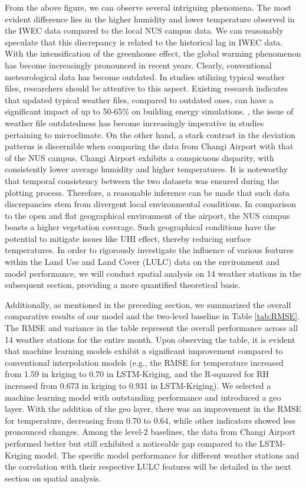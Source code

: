 \documentclass[a4paper,fleqn]{cas-sc}
\begin{document}
From the above figure, we can observe several intriguing phenomena. The most evident difference lies in the higher humidity and lower temperature observed in the IWEC data compared to the local NUS campus data. We can reasonably speculate that this discrepancy is related to the historical lag in IWEC data. With the intensification of the greenhouse effect, the global warming phenomenon has become increasingly pronounced in recent years. Clearly, conventional meteorological data has become outdated. In studies utilizing typical weather files, researchers should be attentive to this aspect. Existing research indicates that updated typical weather files, compared to outdated ones, can have a significant impact of up to 50-65\% on building energy simulations. \citep{costanzo2020updated}, the issue of weather file outdatedness has become increasingly imperative in studies pertaining to microclimate. On the other hand, a stark contrast in the deviation patterns is discernible when comparing the data from Changi Airport with that of the NUS campus. Changi Airport exhibits a conspicuous disparity, with consistently lower average humidity and higher temperatures. It is noteworthy that temporal consistency between the two datasets was ensured during the plotting process. Therefore, a reasonable inference can be made that such data discrepancies stem from divergent local environmental conditions. In comparison to the open and flat geographical environment of the airport, the NUS campus boasts a higher vegetation coverage. Such geographical conditions have the potential to mitigate issues like UHI effect, thereby reducing surface temperatures. In order to rigorously investigate the influence of various features within the Land Use and Land Cover (LULC) data on the environment and model performance, we will conduct spatial analysis on 14 weather stations in the subsequent section, providing a more quantified theoretical basis.

Additionally, as mentioned in the preceding section, we summarized the overall comparative results of our model and the two-level baseline in Table \ref{tab:RMSE}. The RMSE and variance in the table represent the overall performance across all 14 weather stations for the entire month. Upon observing the table, it is evident that machine learning models exhibit a significant improvement compared to conventional interpolation models (e.g., the RMSE for temperature increased from 1.59 in kriging to 0.70 in LSTM-Kriging, and the R-squared for RH increased from 0.673 in kriging to 0.931 in LSTM-Kriging). We selected a machine learning model with outstanding performance and introduced a geo layer. With the addition of the geo layer, there was an improvement in the RMSE for temperature, decreasing from 0.70 to 0.64, while other indicators showed less pronounced changes. Among the level-2 baselines, the data from Changi Airport performed better but still exhibited a noticeable gap compared to the LSTM-Kriging model. The specific model performance for different weather stations and the correlation with their respective LULC features will be detailed in the next section on spatial analysis.
\end{document}
